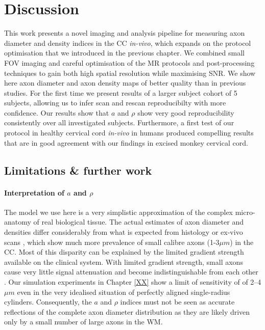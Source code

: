 \section{Discussion}
This work presents a novel imaging and analysis pipeline for measuring axon diameter and density indices in the \gls{CC} \emph{in-vivo}, which expands on the \SFasym{} protocol optimisation that we introduced in the previous chapter. We combined small \gls{FOV} imaging and careful optimisation of the MR protocols and post-processing techniques to gain both high spatial resolution while maximising \gls{SNR}. We show here axon diameter and axon density maps of better quality than in previous studies. For the first time we present results of a larger subject cohort of 5 subjects, allowing us to infer scan and rescan reproducibilty with more confidence. Our results show that $a$ and $\rho$ show very good reproducibility consistently over all investigated subjects. Furthermore, a first test of our protocol in healthy cervical cord \emph{in-vivo} in humans produced compelling results that are in good agreement with our findings in excised monkey cervical cord.

\subsection{Limitations \& further work}
\paragraph{Interpretation of $a$ and $\rho$}The model we use here is a very simplistic approximation of the complex micro-anatomy of real biological tissue. The actual estimates of axon diameter and densities differ considerably from what is expected from histology or ex-vivo scans \citep{Alexander:2010}, which show much more prevalence of small calibre axons (1-3$\mu m$) in the \gls{CC}. Most of this disparity can be explained by the limited gradient strength available on the clinical system.  With limited gradient strength, small axons cause very little signal attenuation and become indistinguishable from each other \citep{Laett:2007,Yeh:2010}. Our simulation experiments in Chapter \ref{XX} show a limit of sensitivity of of 2--4$\mu m$ even in the very idealised situation of perfectly aligned single-radius cylinders. Consequently, the $a$ and $\rho$ indices must not be seen as accurate reflections of the complete axon diameter distribution as they are likely driven only by a small number of large axons in the WM. 

